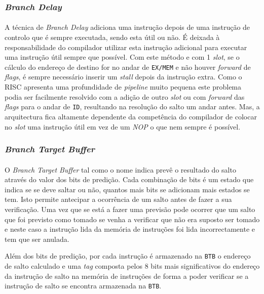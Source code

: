 \subsubsection{\textit{Branch Delay}}
\paragraph{} A técnica de \textit{Branch Delay} adiciona uma instrução depois de uma instrução de controlo que é sempre executada, sendo esta útil ou não. É deixada à responsabilidade do compilador utilizar esta instrução adicional para executar uma instrução útil sempre que possível. Com este método e com 1 \textit{slot}, se o cálculo do endereço de destino for no andar de \texttt{EX/MEM} e não houver \textit{forward} de \textit{flags}, é sempre necessário inserir um \textit{stall} depois da instrução extra. Como o \textmu RISC apresenta uma profundidade de \textit{pipeline} muito pequena este problema podia ser facilmente resolvido com a adição de outro \textit{slot} ou com \textit{forward} das \textit{flags} para o andar de \texttt{ID}, resultando na resolução do salto um andar antes. Mas, a arquitectura fica altamente dependente da competência do compilador de colocar no \textit{slot} uma instrução útil em vez de um \textit{NOP} o que nem sempre é possível.

\subsubsection{\textit{Branch Target Buffer}}

\paragraph{} O \textit{Branch Target Buffer} tal como o nome indica prevê o resultado do salto através do valor dos bits de predição. Cada combinação de bits é um estado que indica se se deve saltar ou não, quantos mais bits se adicionam mais estados se tem. Isto permite antecipar a ocorrência de um salto antes de fazer a sua verificação. Uma vez que se está a fazer uma previsão pode ocorrer que um salto que foi previsto como tomado se venha a verificar que não era suposto ser tomado e neste caso a instrução lida da memória de instruções foi lida incorrectamente e tem que ser anulada.

Além dos bits de predição, por cada instrução é armazenado na \texttt{BTB} o endereço de salto calculado e uma \textit{tag} composta pelos 8 bits mais significativos do endereço da instrução de salto na memória de instruções de forma a poder verificar se a instrução de salto se encontra armazenada na \texttt{BTB}.

